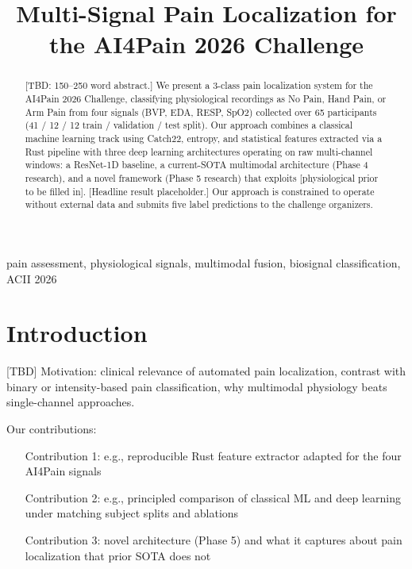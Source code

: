 \documentclass[conference]{IEEEtran}
\title{Multi-Signal Pain Localization for the AI4Pain 2026 Challenge}
\author{
\IEEEauthorblockN{Vignan Kamarthi}
\IEEEauthorblockA{
Northeastern University \\
Boston, MA, USA \\
\textit{kamarthi.v@northeastern.edu}
}
}
\begin{document}
\maketitle

\begin{abstract}
[TBD: 150--250 word abstract.]
We present a 3-class pain localization system for the AI4Pain 2026 Challenge,
classifying physiological recordings as No Pain, Hand Pain, or Arm Pain from
four signals (BVP, EDA, RESP, SpO2) collected over 65 participants
(41 / 12 / 12 train / validation / test split). Our approach combines a
classical machine learning track using Catch22, entropy, and statistical
features extracted via a Rust pipeline with three deep learning architectures
operating on raw multi-channel windows: a ResNet-1D baseline, a current-SOTA
multimodal architecture (Phase 4 research), and a novel framework
(Phase 5 research) that exploits [physiological prior to be filled in].
[Headline result placeholder.] Our approach is constrained to operate without
external data and submits five label predictions to the challenge organizers.
\end{abstract}

\begin{IEEEkeywords}
pain assessment, physiological signals, multimodal fusion, biosignal classification, ACII 2026
\end{IEEEkeywords}

\section{Introduction}
[TBD] Motivation: clinical relevance of automated pain localization,
contrast with binary or intensity-based pain classification, why
multimodal physiology beats single-channel approaches.

Our contributions:
\begin{itemize}
  \item [Contribution 1: e.g., reproducible Rust feature extractor adapted for the four AI4Pain signals]
  \item [Contribution 2: e.g., principled comparison of classical ML and deep learning under matching subject splits and ablations]
  \item [Contribution 3: novel architecture (Phase 5) and what it captures about pain localization that prior SOTA does not]
\end{itemize}
\end{document}
